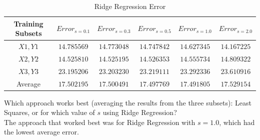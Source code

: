 \documentclass[11pt]{article}
\begin{document}
\begin{table}[!h] 
    \centering
    \caption{Ridge Regression Error}
    \label{ErrRidge2}
    \begin{tabular}{|c|c|c|c|c|c|}
      \hline
   Training Subsets  & $Error_{s=0.1}$ & $Error_{s=0.3}$ &$Error_{s=0.5}$ &$Error_{s=1.0}$ &$Error_{s=2.0}$  \\
      \hline      
      $X1, Y1$ &      $14.785569$  & $14.773048$ & $14.747842$ & $14.627345$ & $14.167225$ \\
      \hline
      $X2, Y2$ &      $14.525810$   & $14.525195$ & $14.526353$ & $14.555734$ & $14.809322$ \\
      \hline
      $X3, Y3$ &      $23.195206$   & $23.203230$ & $23.219111$ & $23.292336$ & $23.610916$ \\
      \hline
      Average &      $17.502195$   & $17.500491$ & $17.497769$ & $17.491805$ & $17.529154$ \\
      \hline
    \end{tabular}
\end{table}

Which approach works best (averaging the results from the three subsets): Least Squares, or for which value of $s$ using Ridge Regression?\\

The approach that worked best was for Ridge Regression with $s=1.0$, which had the lowest average error.
\end{document}
